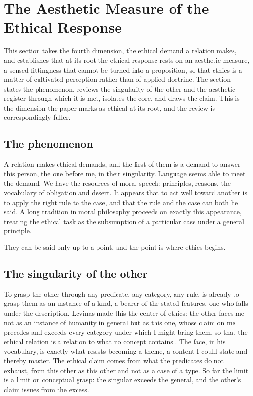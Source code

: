 \section{The Aesthetic Measure of the Ethical Response}
\label{p26:sec:ethics}

\noindent
This section takes the fourth dimension, the ethical demand a relation makes, and establishes that at its root the ethical response rests on an aesthetic measure, a sensed fittingness that cannot be turned into a proposition, so that ethics is a matter of cultivated perception rather than of applied doctrine. The section states the phenomenon, reviews the singularity of the other and the aesthetic register through which it is met, isolates the core, and draws the claim. This is the dimension the paper marks as ethical at its root, and the review is correspondingly fuller.

\subsection*{The phenomenon}

A relation makes ethical demands, and the first of them is a demand to answer this person, the one before me, in their singularity. Language seems able to meet the demand. We have the resources of moral speech: principles, reasons, the vocabulary of obligation and desert. It appears that to act well toward another is to apply the right rule to the case, and that the rule and the case can both be said. A long tradition in moral philosophy proceeds on exactly this appearance, treating the ethical task as the subsumption of a particular case under a general principle.

They can be said only up to a point, and the point is where ethics begins.

\subsection*{The singularity of the other}

To grasp the other through any predicate, any category, any rule, is already to grasp them as an instance of a kind, a bearer of the stated features, one who falls under the description. Levinas made this the center of ethics: the other faces me not as an instance of humanity in general but as this one, whose claim on me precedes and exceeds every category under which I might bring them, so that the ethical relation is a relation to what no concept contains \parencite{levinas1969totality}. The face, in his vocabulary, is exactly what resists becoming a theme, a content I could state and thereby master. The ethical claim comes from what the predicates do not exhaust, from this other as this other and not as a case of a type. So far the limit is a limit on conceptual grasp: the singular exceeds the general, and the other's claim issues from the excess.


